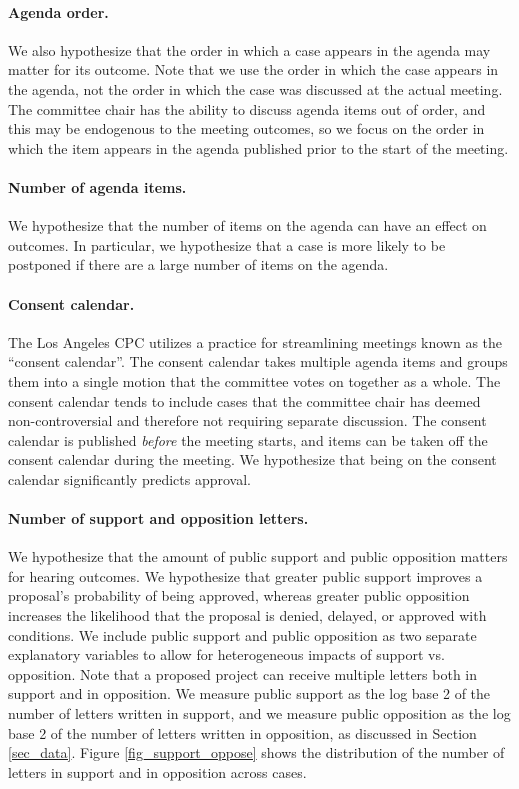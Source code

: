 \paragraph{Agenda order.} We also hypothesize that the order in which a case appears in the agenda may matter for its outcome. Note that we use the order in which the case appears in the agenda, not the order in which the case was discussed at the actual meeting. The committee chair has the ability to discuss agenda items out of order, and this may be endogenous to the meeting outcomes, so we focus on the order in which the item appears in the agenda published prior to the start of the meeting.

\paragraph{Number of agenda items.} We hypothesize that the number of items on the agenda can have an effect on outcomes. In particular, we hypothesize that a case is more likely to be postponed if there are a large number of items on the agenda.

\paragraph{Consent calendar.} The Los Angeles CPC utilizes a practice for streamlining meetings known as the ``consent calendar''. The consent calendar takes multiple agenda items and groups them into a single motion that the committee votes on together as a whole. The consent calendar tends to include cases that the committee chair has deemed non-controversial and therefore not requiring separate discussion. The consent calendar is published \emph{before} the meeting starts, and items can be taken off the consent calendar during the meeting. We hypothesize that being on the consent calendar significantly predicts approval.

\paragraph{Number of support and opposition letters.} We hypothesize that the amount of public support and public opposition matters for hearing outcomes. We hypothesize that greater public support improves a proposal's probability of being approved, whereas greater public opposition increases the likelihood that the proposal is denied, delayed, or approved with conditions. We include public support and public opposition as two separate explanatory variables to allow for heterogeneous impacts of support vs. opposition. Note that a proposed project can receive multiple letters both in support and in opposition. We measure public support as the log base 2 of the number of letters written in support, and we measure public opposition as the log base 2 of the number of letters written in opposition, as discussed in Section \ref{sec_data}. Figure \ref{fig_support_oppose} shows the distribution of the number of letters in support and in opposition across cases. 

